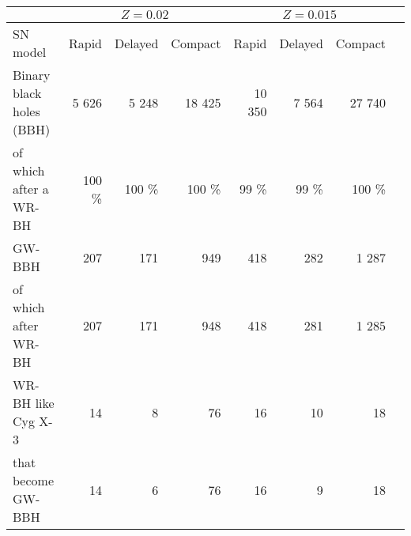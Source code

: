 \documentclass{standalone}
\begin{document}
	\begin{tabular}{lrrrrrrr}
		\toprule
		& \multicolumn{3}{c}{$Z=0.02$} & \multicolumn{3}{c}{$Z=0.015$}  \\
		\midrule
		SN model & Rapid & Delayed & Compact&  Rapid & Delayed & Compact\\
		\midrule
		Binary black holes (BBH)  		& 5 626 & 5 248 & 18 425 & 10 350 & 7 564 & 27 740 \\
		of which after a WR-BH			& 100 \% & 100 \% & 100 \% & 99 \% & 99 \%& 100 \% \\
		\midrule
		GW-BBH  						& 207 & 171 & 949 & 418 & 282 & 1 287 \\
		of which after WR-BH			& 207 & 171 & 948 & 418 & 281 & 1 285 \\
		\midrule
		WR-BH like Cyg X-3  	 		& 14 & 8 & 76 & 16 & 10 & 18 \\
		that become GW-BBH   		 	& 14 & 6 & 76 & 16 & 9 & 18 \\
		\bottomrule 	
	\end{tabular}
\end{document}

